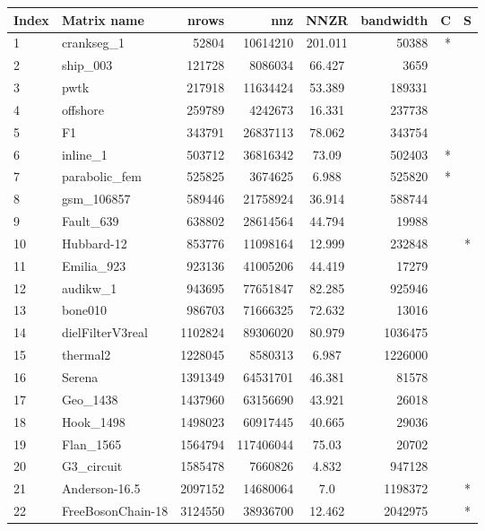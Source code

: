 \begin{tabular}{|l|l|r|r|S[round-mode=places,round-precision=2]|r|r|c|}
\toprule
{Index} & {Matrix name} &  {\acrshort{nrows}} & {\acrshort{nnz}} & {\acrshort{NNZR}} & {bandwidth} & {C} & {S}  \\
\midrule
{1}& {crankseg\_1}	& 52804	& 10614210	& 201.011	& 50388	& {*} &	\\
{2}& {ship\_003}	& 121728	& 8086034	& 66.427	& 3659	& {} &	\\
{3}& {pwtk}	& 217918	& 11634424	& 53.389	& 189331	& {} &	\\
{4}& {offshore}	& 259789	& 4242673	& 16.331	& 237738	& {} &	\\
{5}& {F1}	& 343791	& 26837113	& 78.062	& 343754	& {} &	\\
{6}& {inline\_1}	& 503712	& 36816342	& 73.09	& 502403	& {*} &	\\
{7}& {parabolic\_fem}	& 525825	& 3674625	& 6.988	& 525820	& {*} &	\\
{8}& {gsm\_106857}	& 589446	& 21758924	& 36.914	& 588744	& {} &	\\
{9}& {Fault\_639}	& 638802	& 28614564	& 44.794	& 19988	& {} &	\\
{10}& {Hubbard-12}	& 853776	& 11098164	& 12.999	& 232848	& {} & {*}	\\
{11}& {Emilia\_923}	& 923136	& 41005206	& 44.419	& 17279	& {} &	\\
{12}& {audikw\_1}	& 943695	& 77651847	& 82.285	& 925946	& {} &	\\
{13}& {bone010}	& 986703	& 71666325	& 72.632	& 13016	& {} &	\\
{14}& {dielFilterV3real}	& 1102824	& 89306020	& 80.979	& 1036475	& {} &	\\
{15}& {thermal2}	& 1228045	& 8580313	& 6.987	& 1226000	& {} &	\\
{16}& {Serena}	& 1391349	& 64531701	& 46.381	& 81578	& {} &	\\
{17}& {Geo\_1438}	& 1437960	& 63156690	& 43.921	& 26018	& {} &	\\
{18}& {Hook\_1498}	& 1498023	& 60917445	& 40.665	& 29036	& {} &	\\
{19}& {Flan\_1565}	& 1564794	& 117406044	& 75.03	& 20702	& {} &	\\
{20}& {G3\_circuit}	& 1585478	& 7660826	& 4.832	& 947128	& {} & 	\\
{21}& {Anderson-16.5}	& 2097152	& 14680064	& 7.0	& 1198372	& {} & {*}	\\
{22}& {FreeBosonChain-18}	& 3124550	& 38936700	& 12.462	& 2042975	& {} &	{*}\\

\end{tabular}
